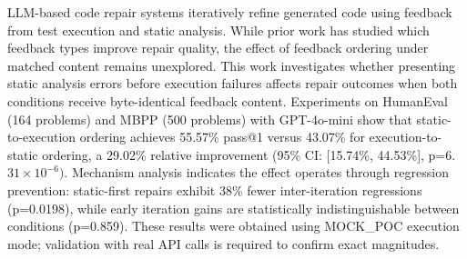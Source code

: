 
LLM-based code repair systems iteratively refine generated code using feedback from test execution and static analysis. While prior work has studied which feedback types improve repair quality, the effect of feedback ordering under matched content remains unexplored. This work investigates whether presenting static analysis errors before execution failures affects repair outcomes when both conditions receive byte-identical feedback content. Experiments on HumanEval (164 problems) and MBPP (500 problems) with GPT-4o-mini show that static-to-execution ordering achieves 55.57\% pass@1 versus 43.07\% for execution-to-static ordering, a 29.02\% relative improvement (95\% CI: [15.74\%, 44.53\%], p=6.$31\times 10^{-6})$. Mechanism analysis indicates the effect operates through regression prevention: static-first repairs exhibit 38\% fewer inter-iteration regressions (p=0.0198), while early iteration gains are statistically indistinguishable between conditions (p=0.859). These results were obtained using MOCK\_POC execution mode; validation with real API calls is required to confirm exact magnitudes.

